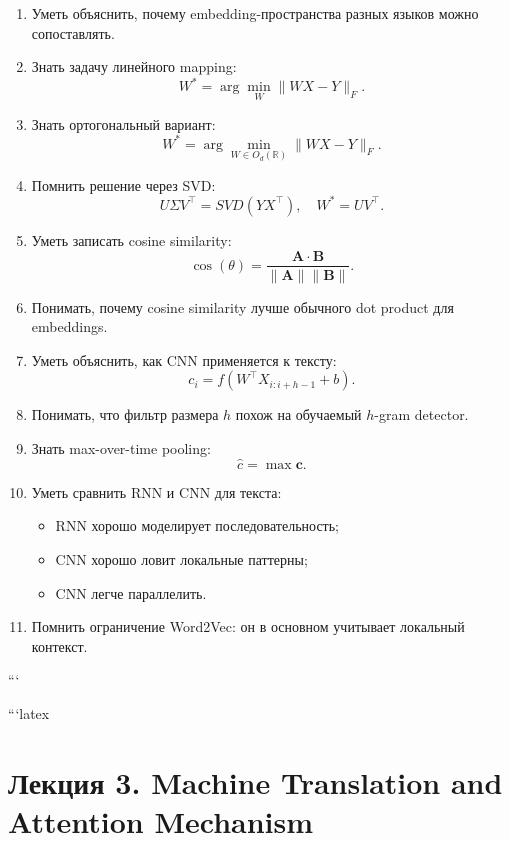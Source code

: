 \documentclass[a4paper,12pt]{article}
\begin{document}
\begin{enumerate}
    \item Уметь объяснить, почему embedding-пространства разных языков можно сопоставлять.

    \item Знать задачу линейного mapping:
    \[
    W^*
    =
    \arg\min_W
    \|WX - Y\|_F.
    \]

    \item Знать ортогональный вариант:
    \[
    W^*
    =
    \arg\min_{W \in O_d(\mathbb{R})}
    \|WX - Y\|_F.
    \]

    \item Помнить решение через SVD:
    \[
    U \Sigma V^\top = SVD(YX^\top),
    \quad
    W^* = UV^\top.
    \]

    \item Уметь записать cosine similarity:
    \[
    \cos(\theta)
    =
    \frac{\bm{A} \cdot \bm{B}}
    {\|\bm{A}\|\|\bm{B}\|}.
    \]

    \item Понимать, почему cosine similarity лучше обычного dot product для embeddings.

    \item Уметь объяснить, как CNN применяется к тексту:
    \[
    c_i
    =
    f(W^\top X_{i:i+h-1} + b).
    \]

    \item Понимать, что фильтр размера \(h\) похож на обучаемый \(h\)-gram detector.

    \item Знать max-over-time pooling:
    \[
    \hat{c} = \max \bm{c}.
    \]

    \item Уметь сравнить RNN и CNN для текста:
    \begin{itemize}
        \item RNN хорошо моделирует последовательность;
        \item CNN хорошо ловит локальные паттерны;
        \item CNN легче параллелить.
    \end{itemize}

    \item Помнить ограничение Word2Vec:
    он в основном учитывает локальный контекст.
\end{enumerate}
```



```latex
\section{Лекция 3. Machine Translation and Attention Mechanism}
\end{document}
